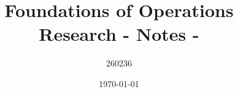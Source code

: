 \author{260236}
\title{Foundations of Operations Research - Notes - \version}
\date{\printdayoff\today}
\maketitle